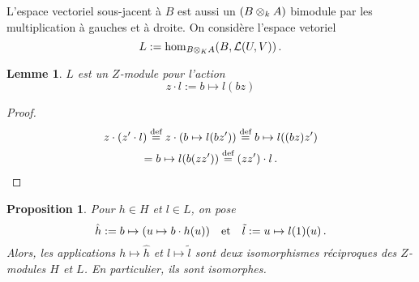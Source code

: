 \documentclass[francais,a4paper,11pt,reqno]{amsart}
\theoremstyle{plain}
\newtheorem{PROP}[THEO]{\bf Proposition}
\newtheorem{LEMME}[THEO]{\bf Lemme}
\theoremstyle{definition}
\theoremstyle{remark}
\newcommand{\act}{\cdot}
\newcommand\eqcom[1]{\mathrel{\overset{\text{#1}}{=}}}
\begin{document}
L'espace vectoriel sous-jacent à $B$ est aussi un $(B\otimes_k A)$ bimodule
par les multiplication à gauches et à droite. On considère l'espace vetoriel
\begin{equation}
  L := \hom_{B\otimes_K A}(B, \operatorname{\mathcal L}(U, V))\,.
\end{equation}
\begin{LEMME}
  $L$ est un $Z$-module pour l'action
  \begin{equation}
    z\act l := b\mapsto l(bz)
  \end{equation}
\end{LEMME}
\begin{proof}
  \begin{multline}
    z\act(z'\act l)
    \eqcom{def}z\act(b \mapsto l(b z'))
    \eqcom{def}b \mapsto l((b z) z') \\
    =b \mapsto l(b (zz')) \eqcom{def}(zz') \act l\,.\qedhere
  \end{multline}
\end{proof}
\begin{PROP}
  Pour $h\in H$ et $l\in L$, on pose
  \begin{equation}
    \hat{h} := b \mapsto (u \mapsto b\act h(u))
    \qandq
    \tilde{l} := u \mapsto l(1)(u)\,.
  \end{equation}
  Alors, les applications $h\mapsto\hat{h}$ et $l\mapsto\tilde{l}$ sont deux
  isomorphismes réciproques des $Z$-modules $H$ et $L$. En particulier, ils
  sont isomorphes.
\end{PROP}
\end{document}
